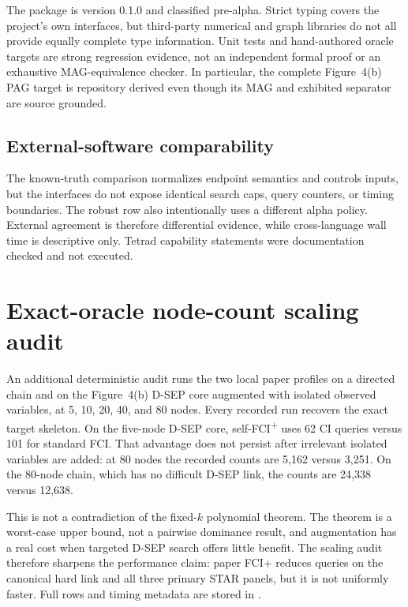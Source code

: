 \documentclass[11pt,a4paper,oneside]{report}
\newcommand{\FCIplus}{FCI\textsuperscript{+}}
\begin{document}
The package is version 0.1.0 and classified pre-alpha.  Strict typing covers
the project's own interfaces, but third-party numerical and graph libraries
do not all provide equally complete type information.  Unit tests and
hand-authored oracle targets are strong regression evidence, not an
independent formal proof or an exhaustive MAG-equivalence checker.  In
particular, the complete Figure~4(b) PAG target is repository derived even
though its MAG and exhibited separator are source grounded.

\subsection{External-software comparability}

The known-truth comparison normalizes endpoint semantics and controls inputs,
but the interfaces do not expose identical search caps, query counters, or
timing boundaries.  The robust row also intentionally uses a different alpha
policy.  External agreement is therefore differential evidence, while
cross-language wall time is descriptive only.  Tetrad capability statements
were documentation checked and not executed.

\section{Exact-oracle node-count scaling audit}

An additional deterministic audit runs the two local paper profiles on a
directed chain and on the Figure~4(b) D-SEP core augmented with isolated
observed variables, at 5, 10, 20, 40, and 80 nodes. Every recorded run recovers
the exact target skeleton. On the five-node D-SEP core, self-\FCIplus{} uses 62
CI queries versus 101 for standard FCI. That advantage does not persist after
irrelevant isolated variables are added: at 80 nodes the recorded counts are
5,162 versus 3,251. On the 80-node chain, which has no difficult D-SEP link,
the counts are 24,338 versus 12,638.

This is not a contradiction of the fixed-\(k\) polynomial theorem. The theorem
is a worst-case upper bound, not a pairwise dominance result, and augmentation
has a real cost when targeted D-SEP search offers little benefit. The scaling
audit therefore sharpens the performance claim: paper FCI+ reduces queries on
the canonical hard link and all three primary STAR panels, but it is not
uniformly faster. Full rows and timing metadata are stored in
.
\end{document}
